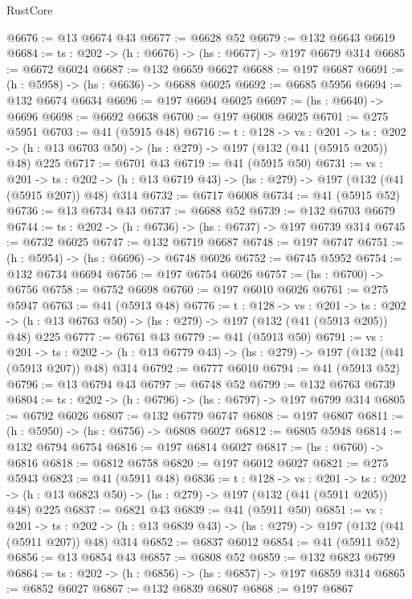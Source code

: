 \begin{lexlean}{RustCore}
\begin{coremodule}
@6676 := @13 @6674 @43
@6677 := @6628 @52
@6679 := @132 @6643 @6619
@6684 := {ts : @202} -> (h : @6676) -> (hs : @6677) -> @197 @6679 @314
@6685 := @6672 @6024
@6687 := @132 @6659 @6627
@6688 := @197 @6687
@6691 := (h : @5958) -> (hs : @6636) -> @6688 @6025
@6692 := @6685 @5956
@6694 := @132 @6674 @6634
@6696 := @197 @6694 @6025
@6697 := (hs : @6640) -> @6696
@6698 := @6692 @6638
@6700 := @197 @6008 @6025
@6701 := @275 @5951
@6703 := @41 (@5915 @48)
@6716 := {t : @128} ->
  {vs : @201} ->
  {ts : @202} -> (h : @13 @6703 @50) -> (hs : @279) -> @197 (@132 (@41 (@5915 @205)) @48) @225
@6717 := @6701 @43
@6719 := @41 (@5915 @50)
@6731 := {vs : @201} ->
  {ts : @202} -> (h : @13 @6719 @43) -> (hs : @279) -> @197 (@132 (@41 (@5915 @207)) @48) @314
@6732 := @6717 @6008
@6734 := @41 (@5915 @52)
@6736 := @13 @6734 @43
@6737 := @6688 @52
@6739 := @132 @6703 @6679
@6744 := {ts : @202} -> (h : @6736) -> (hs : @6737) -> @197 @6739 @314
@6745 := @6732 @6025
@6747 := @132 @6719 @6687
@6748 := @197 @6747
@6751 := (h : @5954) -> (hs : @6696) -> @6748 @6026
@6752 := @6745 @5952
@6754 := @132 @6734 @6694
@6756 := @197 @6754 @6026
@6757 := (hs : @6700) -> @6756
@6758 := @6752 @6698
@6760 := @197 @6010 @6026
@6761 := @275 @5947
@6763 := @41 (@5913 @48)
@6776 := {t : @128} ->
  {vs : @201} ->
  {ts : @202} -> (h : @13 @6763 @50) -> (hs : @279) -> @197 (@132 (@41 (@5913 @205)) @48) @225
@6777 := @6761 @43
@6779 := @41 (@5913 @50)
@6791 := {vs : @201} ->
  {ts : @202} -> (h : @13 @6779 @43) -> (hs : @279) -> @197 (@132 (@41 (@5913 @207)) @48) @314
@6792 := @6777 @6010
@6794 := @41 (@5913 @52)
@6796 := @13 @6794 @43
@6797 := @6748 @52
@6799 := @132 @6763 @6739
@6804 := {ts : @202} -> (h : @6796) -> (hs : @6797) -> @197 @6799 @314
@6805 := @6792 @6026
@6807 := @132 @6779 @6747
@6808 := @197 @6807
@6811 := (h : @5950) -> (hs : @6756) -> @6808 @6027
@6812 := @6805 @5948
@6814 := @132 @6794 @6754
@6816 := @197 @6814 @6027
@6817 := (hs : @6760) -> @6816
@6818 := @6812 @6758
@6820 := @197 @6012 @6027
@6821 := @275 @5943
@6823 := @41 (@5911 @48)
@6836 := {t : @128} ->
  {vs : @201} ->
  {ts : @202} -> (h : @13 @6823 @50) -> (hs : @279) -> @197 (@132 (@41 (@5911 @205)) @48) @225
@6837 := @6821 @43
@6839 := @41 (@5911 @50)
@6851 := {vs : @201} ->
  {ts : @202} -> (h : @13 @6839 @43) -> (hs : @279) -> @197 (@132 (@41 (@5911 @207)) @48) @314
@6852 := @6837 @6012
@6854 := @41 (@5911 @52)
@6856 := @13 @6854 @43
@6857 := @6808 @52
@6859 := @132 @6823 @6799
@6864 := {ts : @202} -> (h : @6856) -> (hs : @6857) -> @197 @6859 @314
@6865 := @6852 @6027
@6867 := @132 @6839 @6807
@6868 := @197 @6867

\end{coremodule}
\end{lexlean}
